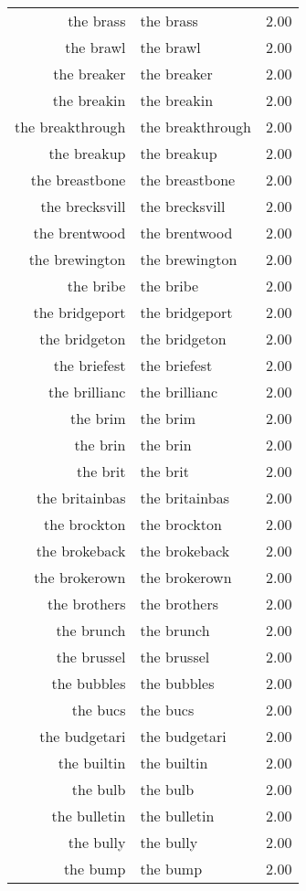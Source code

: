 \begin{table}[ht]
\begin{tabular}{rlr}
  the brass & the brass & 2.00 \\ 
  the brawl & the brawl & 2.00 \\ 
  the breaker & the breaker & 2.00 \\ 
  the breakin & the breakin & 2.00 \\ 
  the breakthrough & the breakthrough & 2.00 \\ 
  the breakup & the breakup & 2.00 \\ 
  the breastbone & the breastbone & 2.00 \\ 
  the brecksvill & the brecksvill & 2.00 \\ 
  the brentwood & the brentwood & 2.00 \\ 
  the brewington & the brewington & 2.00 \\ 
  the bribe & the bribe & 2.00 \\ 
  the bridgeport & the bridgeport & 2.00 \\ 
  the bridgeton & the bridgeton & 2.00 \\ 
  the briefest & the briefest & 2.00 \\ 
  the brillianc & the brillianc & 2.00 \\ 
  the brim & the brim & 2.00 \\ 
  the brin & the brin & 2.00 \\ 
  the brit & the brit & 2.00 \\ 
  the britainbas & the britainbas & 2.00 \\ 
  the brockton & the brockton & 2.00 \\ 
  the brokeback & the brokeback & 2.00 \\ 
  the brokerown & the brokerown & 2.00 \\ 
  the brothers & the brothers & 2.00 \\ 
  the brunch & the brunch & 2.00 \\ 
  the brussel & the brussel & 2.00 \\ 
  the bubbles & the bubbles & 2.00 \\ 
  the bucs & the bucs & 2.00 \\ 
  the budgetari & the budgetari & 2.00 \\ 
  the builtin & the builtin & 2.00 \\ 
  the bulb & the bulb & 2.00 \\ 
  the bulletin & the bulletin & 2.00 \\ 
  the bully & the bully & 2.00 \\ 
  the bump & the bump & 2.00 \\ 

\end{tabular}
\end{table}
